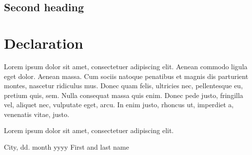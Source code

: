 \section{Second heading}

\chapter{Declaration}
Lorem ipsum dolor sit amet, consectetuer adipiscing elit. Aenean commodo ligula eget dolor. Aenean massa. Cum sociis natoque penatibus et magnis dis parturient montes, nascetur ridiculus mus. Donec quam felis, ultricies nec, pellentesque eu, pretium quis, sem. Nulla consequat massa quis enim. Donec pede justo, fringilla vel, aliquet nec, vulputate eget, arcu. In enim justo, rhoncus ut, imperdiet a, venenatis vitae, justo.\par
\setlength{\parskip}{1em}
\setlength{\parindent}{0pt}
Lorem ipsum dolor sit amet, consectetuer adipiscing elit.\par
\setlength{\parskip}{4em}
City, dd. month yyyy \hfill
First and last name
